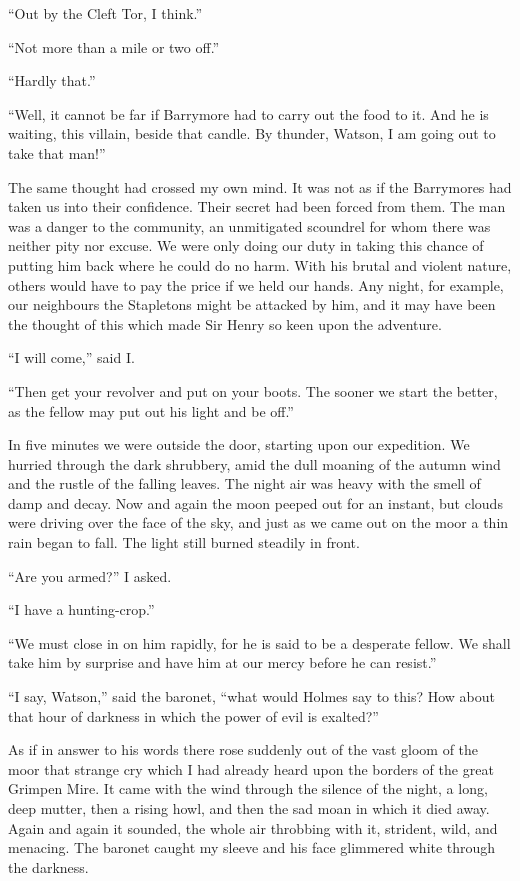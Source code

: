 \documentclass[paper=5.5in:8.5in,BCOR=7mm,twoside,DIV=calc,12pt,usegeometry,openany,chapterprefix,endperiod]{scrbook} %
\begin{document}
\enquote{Out by the Cleft Tor, I think.}

\enquote{Not more than a mile or two off.}

\enquote{Hardly that.}

\enquote{Well, it cannot be far if Barrymore had to carry out the food to it. And he is waiting, this villain, beside that candle. By thunder, Watson, I am going out to take that man!}

The same thought had crossed my own mind. It was not as if the Barrymores had taken us into their confidence. Their secret had been forced from them. The man was a danger to the community, an unmitigated scoundrel for whom there was neither pity nor excuse. We were only doing our duty in taking this chance of putting him back where he could do no harm. With his brutal and violent nature, others would have to pay the price if we held our hands. Any night, for example, our neighbours the Stapletons might be attacked by him, and it may have been the thought of this which made Sir Henry so keen upon the adventure.

\enquote{I will come,} said I.

\enquote{Then get your revolver and put on your boots. The sooner we start the better, as the fellow may put out his light and be off.}

In five minutes we were outside the door, starting upon our expedition. We hurried through the dark shrubbery, amid the dull moaning of the autumn wind and the rustle of the falling leaves. The night air was heavy with the smell of damp and decay. Now and again the moon peeped out for an instant, but clouds were driving over the face of the sky, and just as we came out on the moor a thin rain began to fall. The light still burned steadily in front.

\enquote{Are you armed?} I asked.

\enquote{I have a hunting-crop.}

\enquote{We must close in on him rapidly, for he is said to be a desperate fellow. We shall take him by surprise and have him at our mercy before he can resist.}

\enquote{I say, Watson,} said the baronet, \enquote{what would Holmes say to this? How about that hour of darkness in which the power of evil is exalted?}

As if in answer to his words there rose suddenly out of the vast gloom of the moor that strange cry which I had already heard upon the borders of the great Grimpen Mire. It came with the wind through the silence of the night, a long, deep mutter, then a rising howl, and then the sad moan in which it died away. Again and again it sounded, the whole air throbbing with it, strident, wild, and menacing. The baronet caught my sleeve and his face glimmered white through the darkness.
\end{document}
